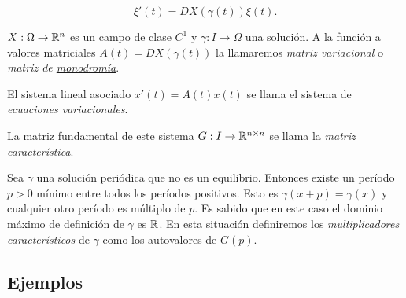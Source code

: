 \[\xi'(t)=DX(\gamma(t))\xi(t).\]


$X:\Omega\to\mathbb{R}^n$ es un campo de clase $C^1$ y $\gamma:I\to\Omega$ una solución. A la función a valores matriciales
$A(t)=DX(\gamma(t))$ la llamaremos \emph{matriz variacional} o \emph{matriz de \href{http://es.wikipedia.org/wiki/Monodromía}{monodromía}}. 

El sistema lineal asociado
$x'(t)=A(t)x(t)$ se llama el sistema de \emph{ecuaciones variacionales}. 
 
La matriz fundamental de este sistema 
$G:I\to\mathbb{R}^{n\times n}$ se llama la \emph{matriz característica}. 

Sea $\gamma$ una solución periódica que no es un equilibrio. Entonces existe un período $p>0$ mínimo
entre todos los períodos positivos. Esto es $\gamma(x+p)=\gamma(x)$  y cualquier otro período es múltiplo de $p$. 
Es sabido que en este caso el dominio máximo de definición de $\gamma$ es $\mathbb{R}$. En esta situación definiremos
los \emph{multiplicadores característicos} de $\gamma$ como los autovalores de $G(p)$.




\subsection{Ejemplos}

